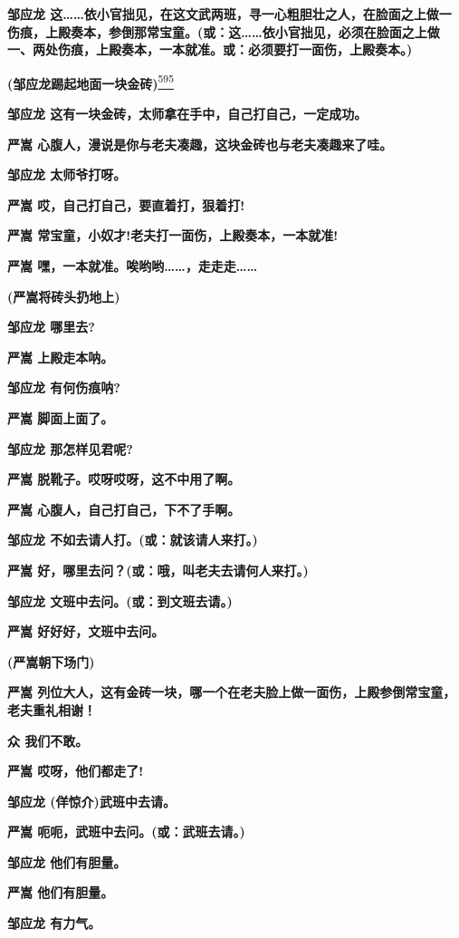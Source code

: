 \textbf{邹应龙
这\ldots{}\ldots{}依小官拙见，在这文武两班，寻一心粗胆壮之人，在脸面之上做一伤痕，上殿奏本，参倒那常宝童。(或：这\ldots{}\ldots{}依小官拙见，必须在脸面之上做一、两处伤痕，上殿奏本，一本就准。或：必须要打一面伤，上殿奏本。)}

\textbf{(邹应龙踢起地面一块金砖)}\protect\hyperlink{fn595}{\textsuperscript{595}}

\textbf{邹应龙 这有一块金砖，太师拿在手中，自己打自己，一定成功。}

\textbf{严嵩 心腹人，漫说是你与老夫凑趣，这块金砖也与老夫凑趣来了哇。}

\textbf{邹应龙 太师爷打呀。}

\textbf{严嵩 哎，自己打自己，要直着打，狠着打!}

\textbf{严嵩 常宝童，小奴才!老夫打一面伤，上殿奏本，一本就准!}

\textbf{严嵩
嘿，一本就准。唉哟哟\ldots{}\ldots{}，走走走\ldots{}\ldots{}}

\textbf{(严嵩将砖头扔地上)}

\textbf{邹应龙 哪里去?}

\textbf{严嵩 上殿走本呐。}

\textbf{邹应龙 有何伤痕呐?}

\textbf{严嵩 脚面上面了。}

\textbf{邹应龙 那怎样见君呢?}

\textbf{严嵩 脱靴子。哎呀哎呀，这不中用了啊。}

\textbf{严嵩 心腹人，自己打自己，下不了手啊。}

\textbf{邹应龙 不如去请人打。(或：就该请人来打。)}

\textbf{严嵩 好，哪里去问？(或：哦，叫老夫去请何人来打。)}

\textbf{邹应龙 文班中去问。(或：到文班去请。)}

\textbf{严嵩 好好好，文班中去问。}

\textbf{(严嵩朝下场门)}

\textbf{严嵩
列位大人，这有金砖一块，哪一个在老夫脸上做一面伤，上殿参倒常宝童，老夫重礼相谢！}

\textbf{众 我们不敢。}

\textbf{严嵩 哎呀，他们都走了!}

\textbf{邹应龙 (佯惊介)武班中去请。}

\textbf{严嵩 呃呃，武班中去问。(或：武班去请。)}

\textbf{邹应龙 他们有胆量。}

\textbf{严嵩 他们有胆量。}

\textbf{邹应龙 有力气。}

